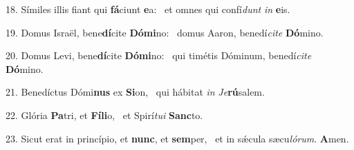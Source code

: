 18. Símiles illis fiant qui \textbf{fá}ciunt \textbf{e}a: \ast\  et omnes qui confí\textit{dunt} \textit{in} \textbf{e}is.\

19. Domus Israël, bene\textbf{dí}cite \textbf{Dó}\textbf{mi}no: \ast\  domus Aaron, benedí\textit{ci}\textit{te} \textbf{Dó}mino.\

20. Domus Levi, bene\textbf{dí}cite \textbf{Dó}\textbf{mi}no: \ast\  qui timétis Dóminum, benedí\textit{ci}\textit{te} \textbf{Dó}mino.\

21. Benedíctus Dómi\textbf{nus} ex \textbf{Si}on, \ast\  qui hábitat \textit{in} \textit{Je}\textbf{rú}salem.\

22. Glória \textbf{Pa}tri, et \textbf{Fí}\textbf{li}o, \ast\  et Spirí\textit{tu}\textit{i} \textbf{Sanc}to.\

23. Sicut erat in princípio, et \textbf{nunc}, et \textbf{sem}per, \ast\  et in sǽcula sæcu\textit{ló}\textit{rum}. \textbf{A}men.\

